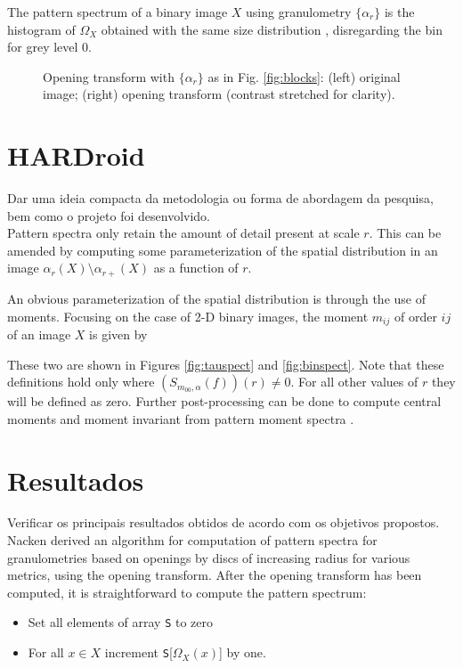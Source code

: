 \documentclass{sciposter}
\begin{document}
\begin{multicols}{3}
The pattern spectrum of a binary image $X$ using granulometry 
$\{\alpha_r\}$ is the histogram of $\Omega_X$ obtained with the same 
size distribution \cite{Nacken:thesis}, disregarding the bin for grey level 0.


\begin{figure}
\begin{center}
\end{center}
\caption{ \label{fig:opentransf} Opening transform with $\{\alpha_r\}$ as in 
 Fig. \ref{fig:blocks}: (left) original image; (right) opening transform
(contrast stretched for clarity). 
}
\end{figure}


\section{HARDroid}
Dar uma ideia compacta da metodologia ou forma de abordagem da pesquisa, bem como o projeto foi desenvolvido.
\\
Pattern spectra only retain the amount of detail present at  scale $r$.
This can be amended by computing some parameterization of the spatial 
distribution in an image $\alpha_r(X) \setminus \alpha_{r+}(X)$ as a function of $r$. 



An obvious parameterization of the spatial distribution is through 
the use of moments. Focusing on the case of 2-D binary images, the 
moment $m_{ij}$ of order $ij$ of an image $X$ is given by

  
These two are shown in Figures \ref{fig:tauspect} and \ref{fig:binspect}. Note that 
these definitions hold only where $(S_{m_{00},\alpha}(f))(r) \neq 0$. For all 
other values of $r$ they will be defined as zero. Further post-processing can
be done to compute central moments and moment invariant from pattern moment 
spectra \cite{Flusser:Suk:93,Hu:62}. 

\section{Resultados}

Verificar os principais resultados obtidos de acordo com os objetivos propostos.\\

Nacken \cite{Nacken:thesis} derived an algorithm for computation
of pattern spectra for granulometries based on openings by discs of increasing
radius for various metrics, using the opening transform. After the
opening transform has been computed, it is straightforward to compute the 
pattern spectrum:
\begin{itemize}
\item Set all elements of array {\tt S} to zero
\item For all $x \in X$ increment {\tt S}[$\Omega_X(x)$] by one. 
\end{itemize}


\end{multicols}
\end{document}

